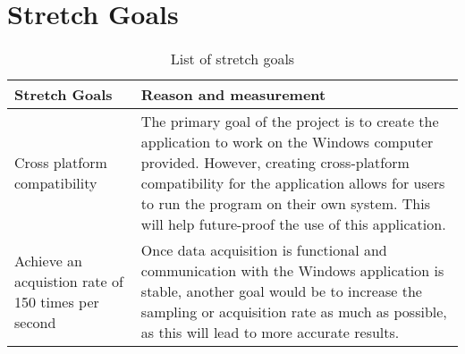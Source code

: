 \documentclass[12pt, titlepage]{article}
\begin{document}
\section{Stretch Goals} %
\begin{table}[h!]
    \centering
    \begin{tabular}{p{} p{}}
    
    \toprule
    \textbf{Stretch Goals} & \textbf{Reason and measurement}\\
   
    \midrule{Cross platform compatibility} & The primary goal of the project is to create the application to work on the Windows computer provided. However, creating cross-platform compatibility for the application allows for users to run the program on their own system. This will help future-proof the use of this application.\\
    \midrule{Achieve an acquistion rate of 150 times per second} & Once data acquisition is functional and communication with the Windows application is stable, another goal would be to increase the sampling or acquisition rate as much as possible, as this will lead to more accurate results. \\
    
    \bottomrule
    
    \end{tabular}
    \caption{List of stretch goals}
\end{table}
\end{document}
